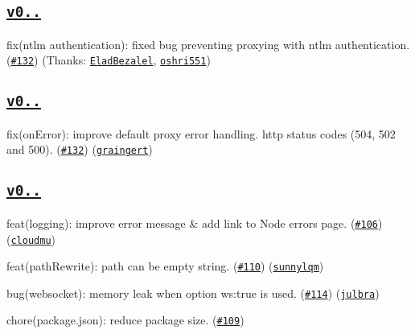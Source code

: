 \subsection*{\href{https://github.com/chimurai/http-proxy-middleware/releases/tag/v0.17.4}{\tt v0..}}


\begin{DoxyItemize}
\item fix(ntlm authentication)\+: fixed bug preventing proxying with ntlm authentication. (\href{https://github.com/chimurai/http-proxy-middleware/pull/149}{\tt \#132}) (Thanks\+: \href{https://github.com/EladBezalel}{\tt Elad\+Bezalel}, \href{https://github.com/oshri551}{\tt oshri551})
\end{DoxyItemize}

\subsection*{\href{https://github.com/chimurai/http-proxy-middleware/releases/tag/v0.17.3}{\tt v0..}}


\begin{DoxyItemize}
\item fix(on\+Error)\+: improve default proxy error handling. http status codes (504, 502 and 500). (\href{https://github.com/chimurai/http-proxy-middleware/pull/132}{\tt \#132}) (\href{https://github.com/graingert}{\tt graingert})
\end{DoxyItemize}

\subsection*{\href{https://github.com/chimurai/http-proxy-middleware/releases/tag/v0.17.2}{\tt v0..}}


\begin{DoxyItemize}
\item feat(logging)\+: improve error message \& add link to Node errors page. (\href{https://github.com/chimurai/http-proxy-middleware/pull/106}{\tt \#106}) (\href{https://github.com/cloudmu}{\tt cloudmu})
\item feat(path\+Rewrite)\+: path can be empty string. (\href{https://github.com/chimurai/http-proxy-middleware/pull/110}{\tt \#110}) (\href{https://github.com/sunnylqm}{\tt sunnylqm})
\item bug(websocket)\+: memory leak when option \textquotesingle{}ws\+:true\textquotesingle{} is used. (\href{https://github.com/chimurai/http-proxy-middleware/pull/114}{\tt \#114}) (\href{https://github.com/julbra}{\tt julbra})
\item chore(package.\+json)\+: reduce package size. (\href{https://github.com/chimurai/http-proxy-middleware/pull/109}{\tt \#109})
\end{DoxyItemize}


